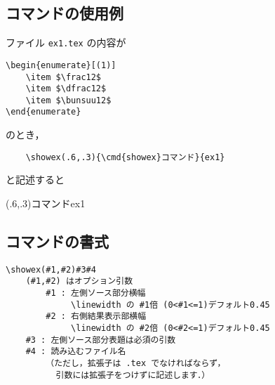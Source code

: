 \documentclass{jarticle}
\begin{document}
\subsection{コマンドの使用例}
ファイル \texttt{ex1.tex} の内容が
\begin{jquote}
\begin{verbatim}
\begin{enumerate}[(1)]
    \item $\frac12$
    \item $\dfrac12$
    \item $\bunsuu12$
\end{enumerate}
\end{verbatim}
\end{jquote}
のとき，
\begin{dblbox}
\begin{verbatim}
    \showex(.6,.3){\cmd{showex}コマンド}{ex1}
\end{verbatim}
\end{dblbox}
と記述すると

    \showex(.6,.3){コマンド}{ex1}

\subsection{コマンドの書式}
\begin{boxnote}
\begin{verbatim}
\showex(#1,#2)#3#4
    (#1,#2) はオプション引数
        #1 : 左側ソース部分横幅
             \linewidth の #1倍 (0<#1<=1)デフォルト0.45
        #2 : 右側結果表示部横幅 
             \linewidth の #2倍 (0<#2<=1)デフォルト0.45
    #3 : 左側ソース部分表題は必須の引数
    #4 : 読み込むファイル名
        （ただし，拡張子は .tex でなければならず，
          引数には拡張子をつけずに記述します．）
\end{verbatim}
\end{boxnote}
\end{document}
